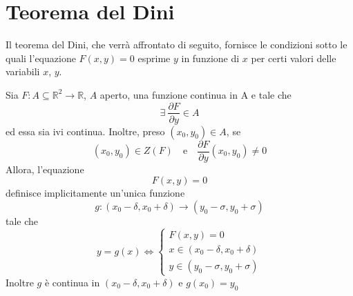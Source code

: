\section{Teorema del Dini}
Il teorema del Dini, che verrà affrontato di seguito, fornisce le condizioni sotto le quali l'equazione $F(x,y)=0$ esprime $y$ in funzione di $x$ per certi valori delle variabili $x$, $y$.
\newpage
\begin{theorem} \label{Teo: Teorema del Dini}
    Sia $F: A \subseteq \mathbb{R}^2 \to \mathbb{R}$, $A$ aperto, una funzione continua in A e tale che
    \begin{equation*}
    \exists\ \frac{\partial{F}}{\partial{y}} \in A 
    \end{equation*}
    ed essa sia ivi continua. Inoltre, preso $(x_0, y_0) \in A$, se 
    \begin{equation*}
    (x_0, y_0) \in Z(F) \quad \text{e} \quad \frac{\partial{F}}{\partial{y}}(x_0, y_0) \neq 0
    \end{equation*}
    Allora, l'equazione
    \begin{equation*}
        F(x, y)=0
    \end{equation*}
    definisce implicitamente un'unica funzione
    \begin{equation*}
        g: (x_0-\delta, x_0+\delta) \to (y_0 - \sigma, y_0+\sigma)
    \end{equation*}
    tale che 
    \begin{equation} \label{Eq: Tesi Dini}
     y=g(x) \iff
        \begin{cases}
            F(x, y)=0\\
            x \in (x_0-\delta, x_0+\delta)\\
            y \in (y_0 - \sigma, y_0+\sigma)
        \end{cases} 
    \end{equation}
    Inoltre $g$ è continua in $(x_0-\delta, x_0+\delta)$ e $g(x_0)=y_0$
\end{theorem}
